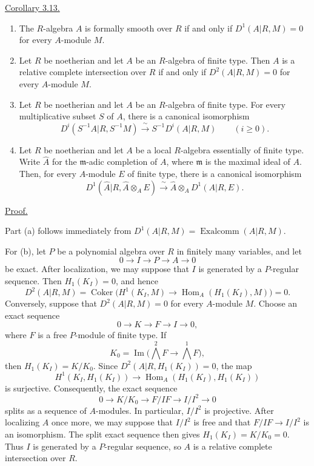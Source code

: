 
\underline{Corollary 3.13.}

\begin{enumerate}[label=(\alph*)]
\item The $R$-algebra $A$ is formally smooth over $R$ if and only if
$D^1(A|R,M)=0$ for every $A$-module $M$.

\item Let $R$ be noetherian and let $A$ be an $R$-algebra of finite
type. Then $A$ is a relative complete intersection over $R$ if and
only if $D^2(A|R,M)=0$ for every $A$-module $M$.

\item Let $R$ be noetherian and let $A$ be an $R$-algebra of finite
type. For every multiplicative subset $S$ of $A$, there is a canonical
isomorphism
\[
 D^i(S^{-1}A|R,S^{-1}M)
 \xrightarrow{\ \sim\ }S^{-1}D^i(A|R,M)
 \qquad(i\geq0).
\]

\item Let $R$ be noetherian and let $A$ be a local $R$-algebra
essentially of finite type. Write $\widehat A$ for the
$\mathfrak m$-adic completion of $A$, where $\mathfrak m$ is the
maximal ideal of $A$. Then, for every $A$-module $E$ of finite type,
there is a canonical isomorphism
\[
 D^1(\widehat A|R,\widehat A\otimes_AE)
 \xrightarrow{\ \sim\ }
 \widehat A\otimes_AD^1(A|R,E).
\]
\end{enumerate}

\underline{Proof.}

Part (a) follows immediately from
$D^1(A|R,M)=\operatorname{Exalcomm}(A|R,M)$.

For (b), let $P$ be a polynomial algebra over $R$ in finitely many
variables, and let
\[
 0\longrightarrow I\longrightarrow P\longrightarrow A
 \longrightarrow0
\]
be exact. After localization, we may suppose that $I$ is generated by
a $P$-regular sequence. Then $H_1(K_I)=0$, and hence
\[
 D^2(A|R,M)
 =\operatorname{Coker}\bigl(
 H^1(K_I,M)\longrightarrow
 \operatorname{Hom}_A(H_1(K_I),M)\bigr)=0.
\]
Conversely, suppose that $D^2(A|R,M)=0$ for every $A$-module $M$.
Choose an exact sequence
\[
 0\longrightarrow K\longrightarrow F\longrightarrow I
 \longrightarrow0,
\]
where $F$ is a free $P$-module of finite type. If
\[
 K_0=\operatorname{Im}\bigl(\textstyle\bigwedge^2F
 \longrightarrow\bigwedge^1F\bigr),
\]
then $H_1(K_I)=K/K_0$. Since
$D^2(A|R,H_1(K_I))=0$, the map
\[
 H^1(K_I,H_1(K_I))
 \longrightarrow
 \operatorname{Hom}_A(H_1(K_I),H_1(K_I))
\]
is surjective. Consequently, the exact sequence
\[
 0\longrightarrow K/K_0\longrightarrow F/IF
 \longrightarrow I/I^2\longrightarrow0
\]
splits as a sequence of $A$-modules. In particular, $I/I^2$ is
projective. After localizing $A$ once more, we may suppose that
$I/I^2$ is free and that $F/IF\longrightarrow I/I^2$ is an
isomorphism. The split exact sequence then gives
$H_1(K_I)=K/K_0=0$. Thus $I$ is generated by a $P$-regular sequence,
so $A$ is a relative complete intersection over $R$.

